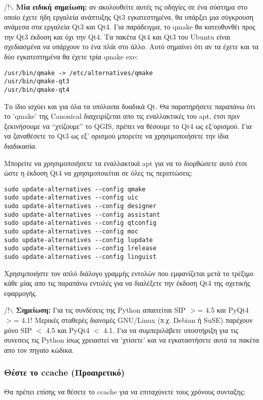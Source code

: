 /!$\backslash$ \textbf{Μία ειδική σημείωση:} αν ακολουθείτε αυτές τις οδηγίες σε ένα σύστημα στο οποίο έχετε ήδη εργαλεία ανάπτυξης Qt3 εγκατεστημένα, θα υπάρξει μια σύγκρουση ανάμεσα στα εργαλεία Qt3 και Qt4. Για παράδειγμα, το qmake θα κατευθυνθέι προς την Qt3 έκδοση και όχι την Qt4. Τα πακέτα Qt4 και Qt3  του Ubuntu είναι σχεδιασμένα να υπάρχουν το ένα πλάι στο άλλο. Αυτό σημαίνει ότι αν τα έχετε και τα δύο εγκατεστημένα θα έχετε τρία qmake exe: 

\begin{verbatim}
/usr/bin/qmake -> /etc/alternatives/qmake 
/usr/bin/qmake-qt3
/usr/bin/qmake-qt4 
\end{verbatim}

Το ίδιο ισχύει και για όλα τα υπόλοιπα δυαδικά Qt. Θα παρατηρήσετε παραπάνω ότι το 'qmake' της Canonical διαχειρίζεται απο τις εναλλακτικές του apt, έτσι πριν ξεκινήσουμε να “χτίζουμε” το QGIS, πρέπει να θέσουμε το Qt4 ως εξ'ορισμού. Για να ξαναθέσετε το Qt3 ως εξ' ορισμού μπορείτε να χρησιμοποιήσετε την ίδια διαδικασία. 

Μπορείτε να χρησιμοποιήσετε τα εναλλακτικά apt για να το διορθώσετε αυτό έτσι ώστε η έκδοση Qt4 να χρησιμοποιείται σε όλες τις περιπτώσεις: 

\begin{verbatim}
sudo update-alternatives --config qmake
sudo update-alternatives --config uic 
sudo update-alternatives --config designer 
sudo update-alternatives --config assistant 
sudo update-alternatives --config qtconfig 
sudo update-alternatives --config moc 
sudo update-alternatives --config lupdate 
sudo update-alternatives --config lrelease 
sudo update-alternatives --config linguist 
\end{verbatim}

Χρησιμποιήστε τον απλό διάλογο γραμμής εντολών που εμφανίζεται μετά το τρέξιμο κάθε μίας απο τις παραπάνω εντολές για να διαλέξετε την έκδοση Qt4 της σχετικής εφαρμογής.

/!$\backslash$ \textbf{Σημείωση:} Για τις συνδέσεις της Python  απαιτείται SIP $>$= 4.5 και PyQt4 $>$= 4.1! Μερικές σταθερές διανομές GNU/Linux (π.χ. Debian ή SuSE) παρέχουν μόνο SIP $<$ 4.5 και PyQt4 $<$ 4.1. Για να συμπεριλάβετε υποστήριξη για τις συνεσεις τις Python ίσως χρειαστεί να 'χτίσετε' και να εγκαταστήσετε αυτά τα πακέτα απο τον πηγαίο κώδικα.

\hypertarget{toc7}{}
\subsubsection{Θέστε το ccache (Προαιρετικό)}
Θα πρέπει επίσης να θέσετε το ccache για να επιταχύνετε τους χρόνους συνταξης:

